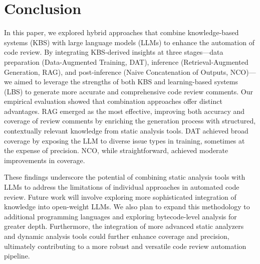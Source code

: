 \section{Conclusion}
\label{sec:conclusion}


In this paper, we explored hybrid approaches that combine knowledge-based systems (KBS) with large language models (LLMs) to enhance the automation of code review. By integrating KBS-derived insights at three stages—data preparation (Data-Augmented Training, DAT), inference (Retrieval-Augmented Generation, RAG), and post-inference (Naive Concatenation of Outputs, NCO)—we aimed to leverage the strengths of both KBS and learning-based systems (LBS) to generate more accurate and comprehensive code review comments.
Our empirical evaluation showed that combination approaches offer distinct advantages. RAG emerged as the most effective, improving both accuracy and coverage of review comments by enriching the generation process with structured, contextually relevant knowledge from static analysis tools. DAT achieved broad coverage by exposing the LLM to diverse issue types in training, sometimes at the expense of precision. NCO, while straightforward, achieved moderate improvements in coverage. 

These findings underscore the potential of combining static analysis tools with LLMs to address the limitations of individual approaches in automated code review. Future work will involve exploring more sophisticated integration of knowledge into open-weight LLMs. We also plan to expand this methodology to additional programming languages and exploring bytecode-level analysis for greater depth. Furthermore, the integration of more advanced static analyzers and dynamic analysis tools could further enhance coverage and precision, ultimately contributing to a more robust and versatile code review automation pipeline.



